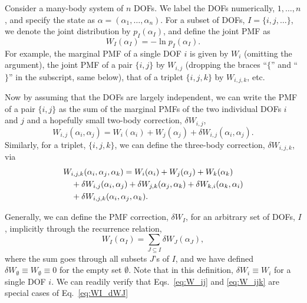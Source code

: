 \documentclass[reprint, superscriptaddress]{revtex4-1}
\begin{document}
Consider a many-body system of $n$ DOFs.
%
We label the DOFs numerically, $1, \dots, n$,
and specify the state as $\alpha = (\alpha_1, \dots, \alpha_n)$.
%
%
For a subset of DOFs, $I = \{i, j, \dots\}$,
we denote the joint distribution by $p_I(\alpha_I)$,
and define the joint PMF as
%
\begin{equation}
  W_I(\alpha_I) = -\ln p_I(\alpha_I)
  .
  \label{eq:WI_def}
\end{equation}
%
For example,
the marginal PMF of a single DOF $i$ is given by $W_i$ (omitting the argument),
the joint PMF of a pair $\{i, j\}$ by $W_{i, j}$
(dropping the braces ``$\{$'' and ``$\}$'' in the subscript, same below),
that of a triplet $\{i, j, k\}$ by $W_{i, j, k}$, etc.

Now by assuming that the DOFs are largely independent,
we can write the PMF of a pair $\{i, j\}$
as the sum of the marginal PMFs of the two individual DOFs $i$ and $j$
and a hopefully small two-body correction, $\delta W_{i,j}$,
%
\begin{equation}
  W_{i,j}(\alpha_i, \alpha_j)
  =
  W_i(\alpha_i) + W_j(\alpha_j)
  + \delta W_{i,j}(\alpha_i, \alpha_j)
  .
  \label{eq:W_ij}
\end{equation}
%
Similarly, for a triplet, $\{i, j, k\}$,
we can define the three-body correction, $\delta W_{i,j,k}$, via
%
\begin{align}
  &W_{i,j,k}(\alpha_i, \alpha_j, \alpha_k)
  =
  W_i(\alpha_i) + W_j(\alpha_j) + W_k(\alpha_k)
  \notag \\
  &\quad
  + \delta W_{i,j}(\alpha_i, \alpha_j)
  + \delta W_{j,k}(\alpha_j, \alpha_k)
  + \delta W_{k,i}(\alpha_k, \alpha_i)
  \notag \\
  &\quad
  + \delta W_{i,j,k}(\alpha_i, \alpha_j, \alpha_k)
  .
  \label{eq:W_ijk}
\end{align}
%


Generally, we can define the PMF correction, $\delta W_I$,
for an arbitrary set of DOFs, $I$,
implicitly through the recurrence relation,
%
\begin{equation}
  W_I(\alpha_I)
  =
  \sum_{J \subseteq I}
  \delta W_J(\alpha_J)
  ,
  \label{eq:WI_dWJ}
\end{equation}
%
where the sum goes through all subsets $J$'s of $I$,
and we have defined
$\delta W_\emptyset \equiv W_\emptyset \equiv 0$
for the empty set $\emptyset$.
%
Note that in this definition,
$\delta W_i \equiv W_i$
for a single DOF $i$.
%
We can readily verify that
Eqs.~\eqref{eq:W_ij} and \eqref{eq:W_ijk}
are special cases of Eq.~\eqref{eq:WI_dWJ}
\end{document}

